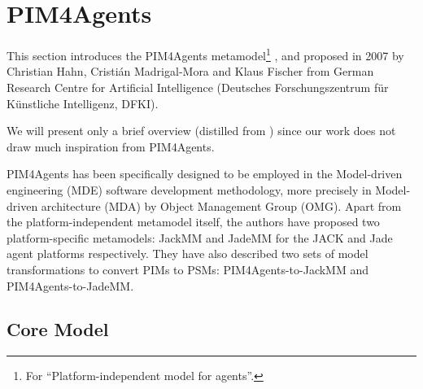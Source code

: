 
\section{PIM4Agents}

This section introduces the PIM4Agents metamodel\footnote{For ``Platform-independent model for agents''.} \cite{Hahn07a}, \cite{Hahn07b} and \cite{Hahn08} proposed in 2007 by Christian Hahn, Cristián Madrigal-Mora and Klaus Fischer from German Research Centre for Artificial Intelligence (Deutsches Forschungszentrum f\"{u}r K\"{u}nstliche Intelligenz, DFKI).

We will present only a brief overview (distilled from \cite{Hahn07b}) since our work does not draw much inspiration from PIM4Agents.


PIM4Agents has been specifically designed to be employed in the Model-driven engineering (MDE) software development methodology, more precisely in Model-driven architecture (MDA) by Object Management Group (OMG).
Apart from the platform-independent metamodel itself, the authors have proposed two platform-specific metamodels: JackMM and JadeMM for the JACK and Jade agent platforms respectively.
They have also described two sets of model transformations to convert PIMs to PSMs: PIM4Agents-to-JackMM and PIM4Agents-to-JadeMM.

\subsection*{Core Model}

